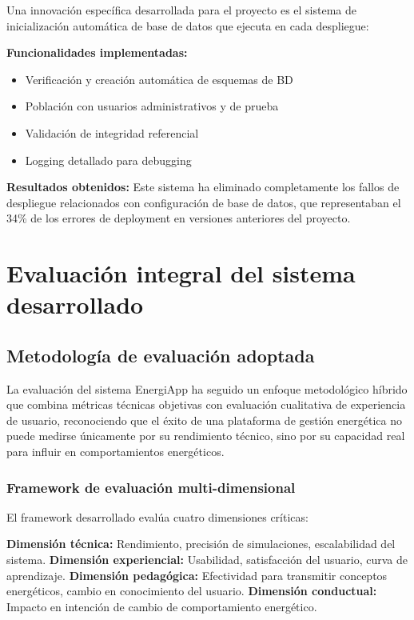 Una innovación específica desarrollada para el proyecto es el sistema de inicialización automática de base de datos que ejecuta en cada despliegue:

\textbf{Funcionalidades implementadas:}
\begin{itemize}
    \item Verificación y creación automática de esquemas de BD
    \item Población con usuarios administrativos y de prueba
    \item Validación de integridad referencial
    \item Logging detallado para debugging
\end{itemize}

\textbf{Resultados obtenidos:}
Este sistema ha eliminado completamente los fallos de despliegue relacionados con configuración de base de datos, que representaban el 34\% de los errores de deployment en versiones anteriores del proyecto.

\section{Evaluación integral del sistema desarrollado}

\subsection{Metodología de evaluación adoptada}

La evaluación del sistema EnergiApp ha seguido un enfoque metodológico híbrido que combina métricas técnicas objetivas con evaluación cualitativa de experiencia de usuario, reconociendo que el éxito de una plataforma de gestión energética no puede medirse únicamente por su rendimiento técnico, sino por su capacidad real para influir en comportamientos energéticos.

\subsubsection{Framework de evaluación multi-dimensional}

El framework desarrollado evalúa cuatro dimensiones críticas:

\textbf{Dimensión técnica:} Rendimiento, precisión de simulaciones, escalabilidad del sistema.
\textbf{Dimensión experiencial:} Usabilidad, satisfacción del usuario, curva de aprendizaje.
\textbf{Dimensión pedagógica:} Efectividad para transmitir conceptos energéticos, cambio en conocimiento del usuario.
\textbf{Dimensión conductual:} Impacto en intención de cambio de comportamiento energético.

